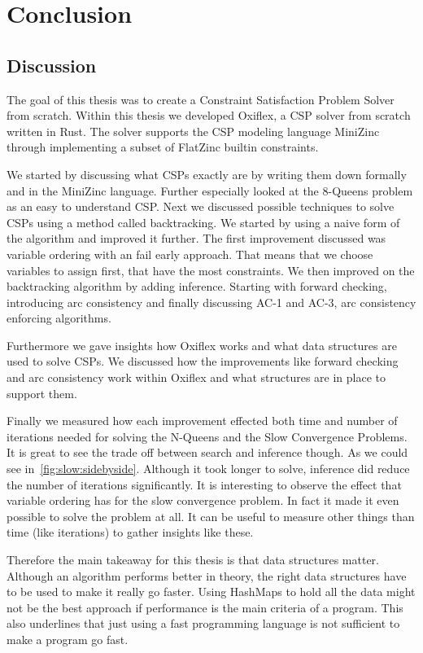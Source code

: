
\chapter{Conclusion} \label{chap:conclusion}

\section{Discussion}

The goal of this thesis was to create a Constraint Satisfaction Problem Solver from scratch. Within this thesis we developed Oxiflex, a CSP solver from scratch written in Rust. The solver supports the CSP modeling language MiniZinc through implementing a subset of FlatZinc builtin constraints.

We started by discussing what CSPs exactly are by writing them down formally and in the MiniZinc language. Further especially looked at the 8-Queens problem as an easy to understand CSP. Next we discussed possible techniques to solve CSPs using a method called backtracking. We started by using a naive form of the algorithm and improved it further. The first improvement discussed was variable ordering with an fail early approach. That means that we choose variables to assign first, that have the most constraints. We then improved on the backtracking algorithm by adding inference. Starting with forward checking, introducing arc consistency and finally discussing AC-1 and AC-3, arc consistency enforcing algorithms.

Furthermore we gave insights how Oxiflex works and what data structures are used to solve CSPs. We discussed how the improvements like forward checking and arc consistency work within Oxiflex and what structures are in place to support them.

Finally we measured how each improvement effected both time and number of iterations needed for solving the N-Queens and the Slow Convergence Problems. It is great to see the trade off between search and inference though. As we could see in~\cref{fig:slow:sidebyside}. Although it took longer to solve, inference did reduce the number of iterations significantly. It is interesting to observe the effect that variable ordering has for the slow convergence problem. In fact it made it even possible to solve the problem at all. It can be useful to measure other things than time (like iterations) to gather insights like these.

Therefore the main takeaway for this thesis is that data structures matter. Although an algorithm performs better in theory, the right data structures have to be used to make it really go faster. Using HashMaps to hold all the data might not be the best approach if performance is the main criteria of a program. This also underlines that just using a fast programming language is not sufficient to make a program go fast.

